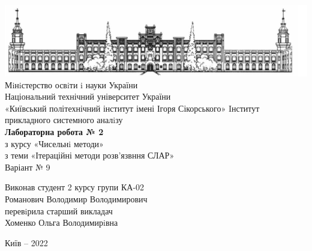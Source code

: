 \documentclass[14 pt]{extarticle}
\begin{document}
\begin{titlepage}
    \begin{center}
        
        \includegraphics[width=18cm]{image1.png}
        Мiнiстерство освiти i науки України \\
        Національний технічний університет України \\
        «Київський політехнічний інститут імені Ігоря Сікорського» Iнститут прикладного системного аналiзу \\

        \vspace{4.5cm}
        \textbf{Лабораторна робота № 2}\\
        з курсу «Чисельнi методи» \\
        з теми «Ітераційні методи розв'язвння СЛАР» \\
        Варіант № 9 \\
    \end{center}

    \vspace{2cm}

    \begin{flushright}
        Виконав студент 2 курсу групи КА-02 \\
        Романович Володимир Володимирович \\
        перевiрила старший викладач \\
        Хоменко Ольга Володимирiвна \\

    \end{flushright}

    \vfill
    \begin{center}
        Київ -- 2022
    \end{center}
\end{titlepage}
\end{document}

